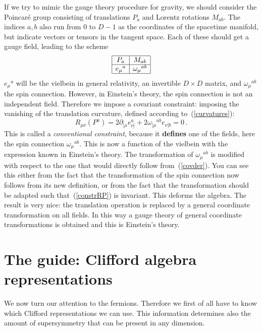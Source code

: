 \documentclass[a4paper,11pt,twoside]{article}
\newcommand{\OliveGreen}[1]{#1}
\newcommand{\RawSienna}[1]{#1}
\newcommand{\Blue}[1]{#1}
\begin{document}
If we try to mimic the gauge theory procedure for gravity, we should
consider the Poincar{\'e} group consisting of translations $\OliveGreen{P_a}$
and Lorentz rotations $\OliveGreen{M_{ab}}$. The indices $a,b$ also run
from 0 to $D-1$ as the coordinates of the spacetime manifold, but
indicate vectors or tensors in the tangent space. Each of these should
get a gauge field, leading to the scheme
\begin{equation}
 \begin{array}{|c|c|}\hline
  \OliveGreen{P_a} & \OliveGreen{M_{ab}} \\ \hline
  \Blue{e_\mu{} ^a} & \Blue{\omega _\mu{}^{ab} }\\ \hline
\end{array}
 \label{gravitygaugef}
\end{equation}
$\Blue{e_\mu{} ^a}$ will be the vielbein in general relativity, an
invertible $D\times D$ matrix, and $\Blue{\omega _\mu{}^{ab} }$ the spin
connection. However, in Einstein's theory, the spin connection is not an
independent field. Therefore we impose a covariant constraint: imposing
the vanishing of the translation curvature, defined according
to~(\ref{curvatures}):
\begin{equation}
  \RawSienna{R_{\mu \nu }(P^a)}=2\partial_{[\mu}
\Blue{e_{\nu]}^a}+2\Blue{\omega_{[\mu}{}^{ab}e_{\nu] b}}=0\,.
 \label{constrRP}
\end{equation}
This is called a \emph{conventional constraint}, because it
\textbf{defines} one of the fields, here the spin connection
$\Blue{\omega _\mu{}^{ab} }$. This is now a function of the vielbein with
the expression known in Einstein's theory. %
The transformation of $\Blue{\omega _\mu{}^{ab} }$ is modified with
respect to the one that would directly follow from~(\ref{covder}). You
can see this either from the fact that the transformation of the spin
connection now follows from its new definition, or from the fact that the
transformation should be adapted such that~(\ref{constrRP}) is invariant.
This deforms the algebra. The result is very nice: the translation
operation is replaced by a general coordinate transformation on all
fields. In this way a gauge theory of general coordinate transformations
is obtained and this is Einstein's theory.
\section{The guide: Clifford algebra representations} \label{ss:Clifford}
We now turn our attention to the fermions. Therefore we first of all have
to know which Clifford representations we can use. This information
determines also the amount of supersymmetry that can be present in any
dimension.
\end{document}

